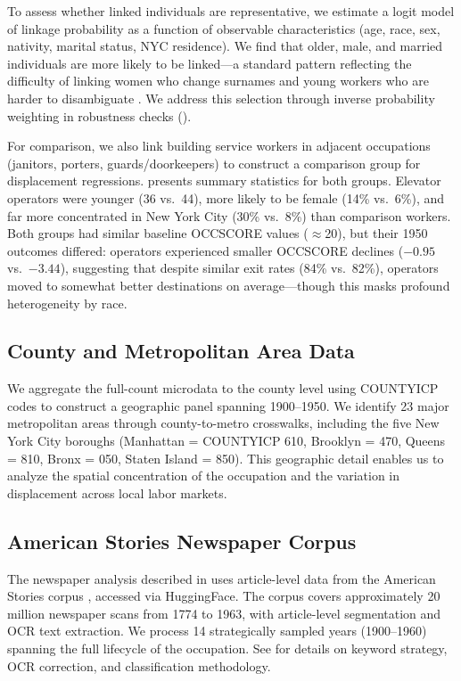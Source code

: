 \documentclass[12pt]{article}
\begin{document}
To assess whether linked individuals are representative, we estimate a logit model of linkage probability as a function of observable characteristics (age, race, sex, nativity, marital status, NYC residence). We find that older, male, and married individuals are more likely to be linked---a standard pattern reflecting the difficulty of linking women who change surnames and young workers who are harder to disambiguate \citep{bailey2020}. We address this selection through inverse probability weighting in robustness checks ().

For comparison, we also link building service workers in adjacent occupations (janitors, porters, guards/doorkeepers) to construct a comparison group for displacement regressions.  presents summary statistics for both groups. Elevator operators were younger (36 vs.\ 44), more likely to be female (14\% vs.\ 6\%), and far more concentrated in New York City (30\% vs.\ 8\%) than comparison workers. Both groups had similar baseline OCCSCORE values ($\approx$20), but their 1950 outcomes differed: operators experienced smaller OCCSCORE declines ($-0.95$ vs.\ $-3.44$), suggesting that despite similar exit rates (84\% vs.\ 82\%), operators moved to somewhat better destinations on average---though this masks profound heterogeneity by race.


\label{tab:sumstats}

\subsection{County and Metropolitan Area Data}

We aggregate the full-count microdata to the county level using COUNTYICP codes to construct a geographic panel spanning 1900--1950. We identify 23 major metropolitan areas through county-to-metro crosswalks, including the five New York City boroughs (Manhattan = COUNTYICP 610, Brooklyn = 470, Queens = 810, Bronx = 050, Staten Island = 850). This geographic detail enables us to analyze the spatial concentration of the occupation and the variation in displacement across local labor markets.

\subsection{American Stories Newspaper Corpus}

The newspaper analysis described in  uses article-level data from the American Stories corpus \citep{dell2023}, accessed via HuggingFace. The corpus covers approximately 20 million newspaper scans from 1774 to 1963, with article-level segmentation and OCR text extraction. We process 14 strategically sampled years (1900--1960) spanning the full lifecycle of the occupation. See  for details on keyword strategy, OCR correction, and classification methodology.
\end{document}
